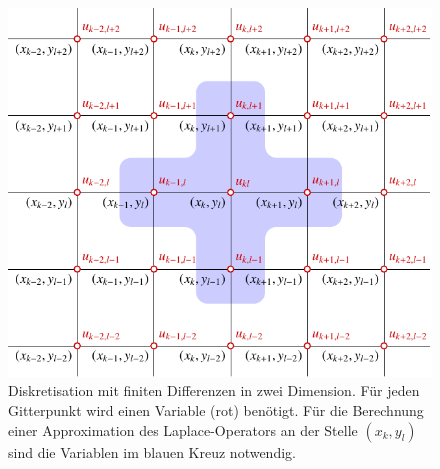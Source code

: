 %
%
%
\begin{figure}
\centering
\includegraphics{chapters/090-pdenumerik/images/2d.pdf}
\caption{Diskretisation mit finiten Differenzen in zwei Dimension.
Für jeden Gitterpunkt wird einen Variable ({\color{darkred}rot}) benötigt.
Für die Berechnung einer Approximation des Laplace-Operators an der
Stelle $(x_k,y_l)$ sind die Variablen im blauen Kreuz notwendig.
\label{buch:pdenumerik:fdm:fig:2d}}
\end{figure}
